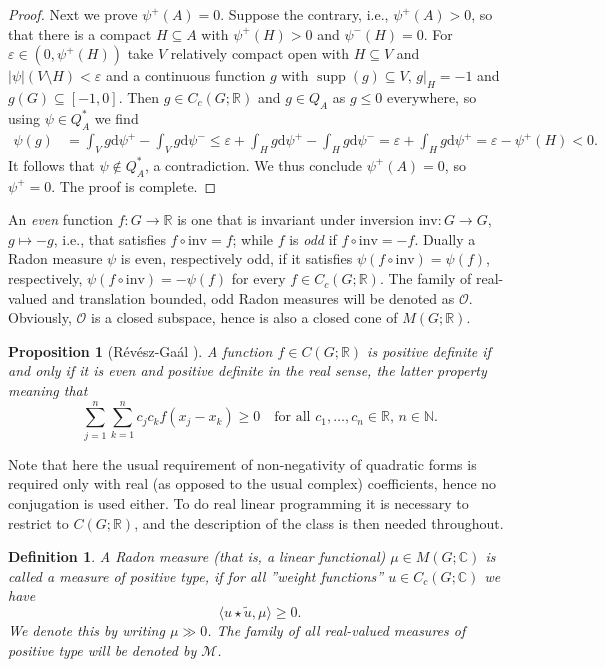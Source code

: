 \documentclass[[a4paper,english,12pt]{amsart}
\theoremstyle{plain}
\newtheorem{definition}[theorem]{Definition}
\newtheorem{proposition}[theorem]{Proposition}
\theoremstyle{remark}
\newcommand\supp{\operatorname{supp}}
\newcommand{\MM}{\mathcal{M}}
\newcommand{\OO}{\mathcal{O}}
\newcommand{\RR}{\mathbb R}
\newcommand{\NN}{\mathbb N}
\newcommand{\CC}{\mathbb C}
\def\inv{\mathrm{inv}}
\def\veps{\varepsilon}
\def\dd{\mathrm{d}}
\begin{document}
\begin{proof}
\medskip\noindent Next we prove $\psi^+(A)=0$. Suppose the contrary, i.e., $\psi^+(A)>0$, so that there is a compact $H\subseteq A$ with $\psi^{+}(H)>0$ and $\psi^{-}(H)=0$. For $\veps\in (0,\psi^+(H))$ take $V$ relatively compact open with $H\subseteq V$ and $|\psi|(V\setminus H)<\veps$ and a continuous function $g$ with $\supp(g)\subseteq V$, $g|_H=-1$ and $g(G)\subseteq [-1,0]$. Then $g\in C_c(G;\RR)$ and $g \in Q_A$ as $g\le 0$ everywhere, so using $\psi \in Q_A^*$ we find
\begin{align*}
\psi(g)&=\int_V g\dd\psi^+-\int_Vg \dd\psi^-\leq \veps +\int_H g\dd\psi^+-\int_H g \dd\psi^-=\veps+\int_H g\dd\psi^+=\veps-\psi^+(H)<0.
\end{align*}
It follows that  $\psi\not \in Q_A^*$, a contradiction. We thus conclude  $\psi^+(A)=0$, so $\psi^+=0$. The proof is complete.
\end{proof}


An \emph{even} function $f:G\to \RR$ is one that is invariant under inversion $\inv:G\to G$, $g\mapsto -g$, i.e., that satisfies $f\circ \inv=f$; while $f$ is \emph{odd} if $f\circ \inv=-f$.
Dually a Radon measure $\psi$ is even, respectively odd, if it satisfies
$\psi(f\circ \inv)=\psi(f)$, respectively, $\psi(f\circ \inv)=-\psi(f)$ for every $f\in C_c(G;\RR)$. The family of real-valued and translation bounded, odd Radon measures will be denoted as $\OO$. Obviously,  $\OO$ is a closed subspace, hence is also a closed cone of $M(G;\RR)$.
\begin{proposition}[R\'ev\'esz-Ga\'al \cite{Zeitschrift}]\label{prop:realposdeffunct}
A function $f\in C(G;\RR)$ is positive definite if and only if it is even and  \emph{positive definite in the real sense}, the latter property meaning that
\[
\sum_{j=1}^n \sum_{k=1}^n c_j c_k f(x_j-x_k) \ge 0 \quad\text{for all $c_1,\ldots,c_n \in \RR$, $n \in \NN$}.
\]
\end{proposition}

Note that here the usual requirement of non-negativity of quadratic forms is required only with real (as opposed to the usual complex) coefficients, hence no conjugation is used either. To do real linear programming it is necessary to restrict to $C(G;\RR)$, and the description of the class is then needed throughout.

\begin{definition}
	A Radon measure (that is, a linear functional) $\mu \in M(G;\CC)$ is called a \emph{measure of positive type}, if for all ''weight functions'' $ u\in C_c(G;\CC)$ we have
	\begin{equation}\label{eqposdef}
	\langle u\star \widetilde{u},\mu\rangle \ge 0.
\end{equation}
We denote this by writing $\mu\gg 0$.
The family of all real-valued measures of positive type will be denoted by $\MM$.
\end{definition}
\end{document}
